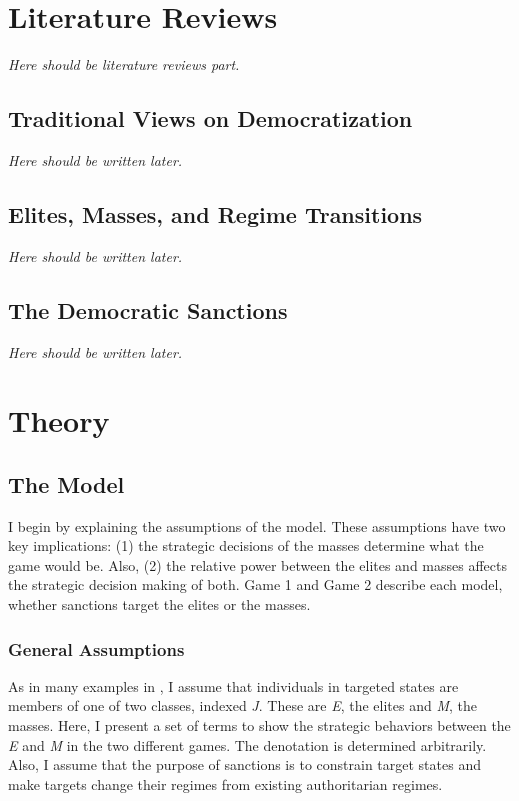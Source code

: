 \documentclass[11pt, letterpage]{article}
\begin{document}
\section*{Literature Reviews}	
\textit{Here should be literature reviews part.}

\subsection*{Traditional Views on Democratization}
\textit{Here should be written later.}

\subsection*{Elites, Masses, and Regime Transitions}
\textit{Here should be written later.}

\subsection*{The Democratic Sanctions}
\textit{Here should be written later.}

\section*{Theory}
\subsection*{The Model}
I begin by explaining the assumptions of the model. These assumptions have two key implications: (1) the strategic decisions of the masses determine what the game would be. Also, (2) the relative power between the elites and masses affects the strategic decision making of both. Game 1 and Game 2 describe each model, whether sanctions target the elites or the masses.
	
\subsubsection*{General Assumptions}
As in many examples in \cite{Acemoglu2006a}, I assume that individuals in targeted states are members of one of two classes, indexed \textit{J}. These are \textit{E}, the elites and \textit{M}, the masses. Here, I present a set of terms to show the strategic behaviors between the \textit{E} and \textit{M} in the two different games. The denotation is determined arbitrarily. Also, I assume that the purpose of sanctions is to constrain target states and make targets change their regimes from existing authoritarian regimes.
	
\end{document}
